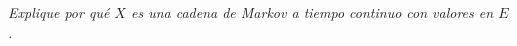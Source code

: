 \emph{
    Explique por qu\'e $X$ es una cadena de Markov a tiempo continuo con valores en $E$.\pn 
}
\afterstatement\pn